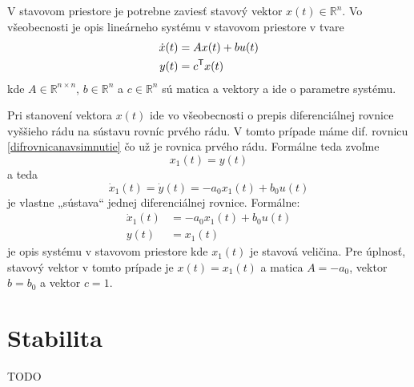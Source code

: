 \documentclass[a4paper, 10pt, ]{article}
\begin{document}
V stavovom priestore je potrebne zaviesť stavový vektor $x(t) \in \mathbb R^n$. Vo všeobecnosti je opis lineárneho systému v stavovom priestore v tvare
\begin{subequations}
\begin{align}
    \dot x(t) &= A x(t) + b u(t) \\
    y(t) &= c^{\mathsf{T}} x(t) 
\end{align}
\end{subequations}
kde $A \in \mathbb R^{n \times n}$, $b \in \mathbb R^n$ a $c \in \mathbb R^n$ sú matica a vektory a ide o parametre systému. 

Pri stanovení vektora $x(t)$ ide vo všeobecnosti o prepis diferenciálnej rovnice vyššieho rádu na sústavu rovníc prvého rádu. V tomto prípade máme dif. rovnicu \eqref{difrovnicanavsimnutie} čo už je rovnica prvého rádu. Formálne teda zvoľme
\begin{equation}
    x_1(t) = y(t)
\end{equation}
a teda
\begin{equation}
    \dot x_1(t) = \dot y(t) = - a_0 x_1(t) + b_0 u(t)
\end{equation}
je vlastne „sústava“ jednej diferenciálnej rovnice. Formálne:
\begin{subequations}
\begin{align}
    \dot x_1(t) &= - a_0 x_1(t) + b_0 u(t) \\
    y(t) &= x_1(t)
\end{align}
\end{subequations}
je opis systému v stavovom priestore kde $x_1(t)$ je stavová veličina. Pre úplnosť, stavový vektor v tomto prípade je $x(t) = x_1(t)$ a matica $A = -a_0$, vektor $b = b_0$ a vektor $c = 1$.




\section{Stabilita}

TODO




















\end{document}
